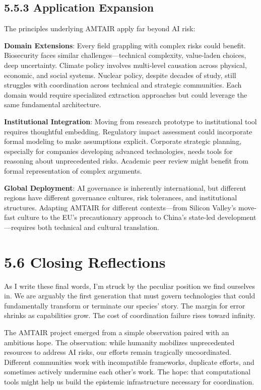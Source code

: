 \documentclass[
  11pt,
  letterpaper,
  openany]{book}
\begin{document}
\subsection{5.5.3 Application
Expansion}\label{sec-application-expansion}

The principles underlying AMTAIR apply far beyond AI risk:

\textbf{Domain Extensions}: Every field grappling with complex risks
could benefit. Biosecurity faces similar challenges---technical
complexity, value-laden choices, deep uncertainty. Climate policy
involves multi-level causation across physical, economic, and social
systems. Nuclear policy, despite decades of study, still struggles with
coordination across technical and strategic communities. Each domain
would require specialized extraction approaches but could leverage the
same fundamental architecture.

\textbf{Institutional Integration}: Moving from research prototype to
institutional tool requires thoughtful embedding. Regulatory impact
assessment could incorporate formal modeling to make assumptions
explicit. Corporate strategic planning, especially for companies
developing advanced technologies, needs tools for reasoning about
unprecedented risks. Academic peer review might benefit from formal
representation of complex arguments.

\textbf{Global Deployment}: AI governance is inherently international,
but different regions have different governance cultures, risk
tolerances, and institutional structures. Adapting AMTAIR for different
contexts---from Silicon Valley's move-fast culture to the EU's
precautionary approach to China's state-led development---requires both
technical and cultural translation.

\section{5.6 Closing Reflections}\label{sec-closing-reflections}

As I write these final words, I'm struck by the peculiar position we
find ourselves in. We are arguably the first generation that must govern
technologies that could fundamentally transform or terminate our
species' story. The margin for error shrinks as capabilities grow. The
cost of coordination failure rises toward infinity.

The AMTAIR project emerged from a simple observation paired with an
ambitious hope. The observation: while humanity mobilizes unprecedented
resources to address AI risks, our efforts remain tragically
uncoordinated. Different communities work with incompatible frameworks,
duplicate efforts, and sometimes actively undermine each other's work.
The hope: that computational tools might help us build the epistemic
infrastructure necessary for coordination.
\end{document}
